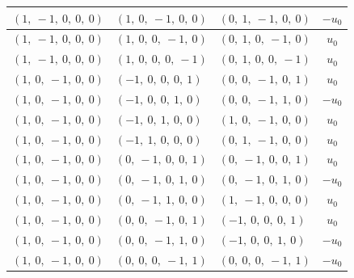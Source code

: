 \documentclass[11pt]{article}
\theoremstyle{definition}
\begin{document}
\begin{longtable}{|l|l|l|c|}
    \hline
    $\left( 1, \  -1, \  0, \  0, \  0\right)$ & $\left( 1, \  0, \  -1, \  0, \  0\right)$ & $\left( 0, \  1, \  -1, \  0, \  0\right)$ & $- u_{0}$ \\
    \hline
    $\left( 1, \  -1, \  0, \  0, \  0\right)$ & $\left( 1, \  0, \  0, \  -1, \  0\right)$ & $\left( 0, \  1, \  0, \  -1, \  0\right)$ & $u_{0}$ \\
    \hline
    $\left( 1, \  -1, \  0, \  0, \  0\right)$ & $\left( 1, \  0, \  0, \  0, \  -1\right)$ & $\left( 0, \  1, \  0, \  0, \  -1\right)$ & $u_{0}$ \\
    \hline
    $\left( 1, \  0, \  -1, \  0, \  0\right)$ & $\left( -1, \  0, \  0, \  0, \  1\right)$ & $\left( 0, \  0, \  -1, \  0, \  1\right)$ & $u_{0}$ \\
    \hline
    $\left( 1, \  0, \  -1, \  0, \  0\right)$ & $\left( -1, \  0, \  0, \  1, \  0\right)$ & $\left( 0, \  0, \  -1, \  1, \  0\right)$ & $- u_{0}$ \\
    \hline
    $\left( 1, \  0, \  -1, \  0, \  0\right)$ & $\left( -1, \  0, \  1, \  0, \  0\right)$ & $\left( 1, \  0, \  -1, \  0, \  0\right)$ & $u_{0}$ \\
    \hline
    $\left( 1, \  0, \  -1, \  0, \  0\right)$ & $\left( -1, \  1, \  0, \  0, \  0\right)$ & $\left( 0, \  1, \  -1, \  0, \  0\right)$ & $u_{0}$ \\
    \hline
    $\left( 1, \  0, \  -1, \  0, \  0\right)$ & $\left( 0, \  -1, \  0, \  0, \  1\right)$ & $\left( 0, \  -1, \  0, \  0, \  1\right)$ & $u_{0}$ \\
    \hline
    $\left( 1, \  0, \  -1, \  0, \  0\right)$ & $\left( 0, \  -1, \  0, \  1, \  0\right)$ & $\left( 0, \  -1, \  0, \  1, \  0\right)$ & $- u_{0}$ \\
    \hline
    $\left( 1, \  0, \  -1, \  0, \  0\right)$ & $\left( 0, \  -1, \  1, \  0, \  0\right)$ & $\left( 1, \  -1, \  0, \  0, \  0\right)$ & $u_{0}$ \\
    \hline
    $\left( 1, \  0, \  -1, \  0, \  0\right)$ & $\left( 0, \  0, \  -1, \  0, \  1\right)$ & $\left( -1, \  0, \  0, \  0, \  1\right)$ & $u_{0}$ \\
    \hline
    $\left( 1, \  0, \  -1, \  0, \  0\right)$ & $\left( 0, \  0, \  -1, \  1, \  0\right)$ & $\left( -1, \  0, \  0, \  1, \  0\right)$ & $- u_{0}$ \\
    \hline
    $\left( 1, \  0, \  -1, \  0, \  0\right)$ & $\left( 0, \  0, \  0, \  -1, \  1\right)$ & $\left( 0, \  0, \  0, \  -1, \  1\right)$ & $- u_{0}$ \\

\end{longtable}
\end{document}
